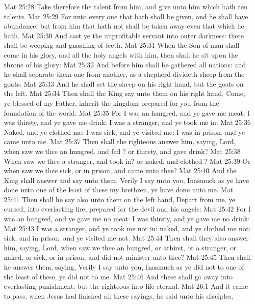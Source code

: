 \vs Mat 25:28 Take therefore the talent from him, and give  unto him which hath ten talents.
\vs Mat 25:29 For unto every one that hath shall be given, and he shall have abundance: but from him that hath not shall be taken away even that which he hath.
\vs Mat 25:30 And cast ye the unprofitable servant into outer darkness: there shall be weeping and gnashing of teeth.
\vs Mat 25:31 When the Son of man shall come in his glory, and all the holy angels with him, then shall he sit upon the throne of his glory:
\vs Mat 25:32 And before him shall be gathered all nations: and he shall separate them one from another, as a shepherd divideth  sheep from the goats:
\vs Mat 25:33 And he shall set the sheep on his right hand, but the goats on the left.
\vs Mat 25:34 Then shall the King say unto them on his right hand, Come, ye blessed of my Father, inherit the kingdom prepared for you from the foundation of the world:
\vs Mat 25:35 For I was an hungred, and ye gave me meat: I was thirsty, and ye gave me drink: I was a stranger, and ye took me in:
\vs Mat 25:36 Naked, and ye clothed me: I was sick, and ye visited me: I was in prison, and ye came unto me.
\vs Mat 25:37 Then shall the righteous answer him, saying, Lord, when saw we thee an hungred, and fed ? or thirsty, and gave  drink?
\vs Mat 25:38 When saw we thee a stranger, and took  in? or naked, and clothed ?
\vs Mat 25:39 Or when saw we thee sick, or in prison, and came unto thee?
\vs Mat 25:40 And the King shall answer and say unto them, Verily I say unto you, Inasmuch as ye have done  unto one of the least of these my brethren, ye have done  unto me.
\vs Mat 25:41 Then shall he say also unto them on the left hand, Depart from me, ye cursed, into everlasting fire, prepared for the devil and his angels:
\vs Mat 25:42 For I was an hungred, and ye gave me no meat: I was thirsty, and ye gave me no drink:
\vs Mat 25:43 I was a stranger, and ye took me not in: naked, and ye clothed me not: sick, and in prison, and ye visited me not.
\vs Mat 25:44 Then shall they also answer him, saying, Lord, when saw we thee an hungred, or athirst, or a stranger, or naked, or sick, or in prison, and did not minister unto thee?
\vs Mat 25:45 Then shall he answer them, saying, Verily I say unto you, Inasmuch as ye did  not to one of the least of these, ye did  not to me.
\vs Mat 25:46 And these shall go away into everlasting punishment: but the righteous into life eternal.
\vs Mat 26:1 And it came to pass, when Jesus had finished all these sayings, he said unto his disciples,
